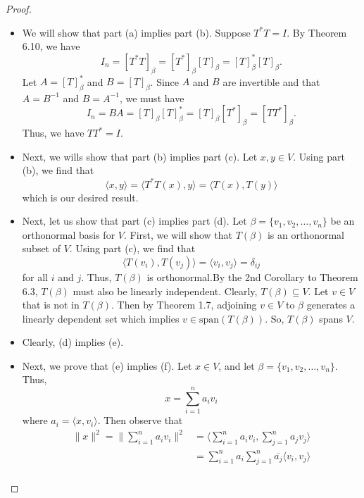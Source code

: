 \begin{proof}
    \begin{itemize}
        \item We will show that part (a) implies part (b). Suppose \( T^{*}T = I  \). By Theorem 6.10, we have  
            \[ {I}_{n} = [T^{*}T]_{\beta} = [T^{*}]_{\beta} [T]_{\beta} = [T]_{\beta}^{*} [T]_{\beta}.  \]
            Let \( A = [T]_{\beta}^{*}  \) and \( B = [T]_{\beta} \). Since \( A  \) and \( B  \) are invertible and that \( A = B^{-1} \) and \( B = A^{-1} \), we must have
            \[ {I}_{n} = BA = [T]_{\beta}[T]_{\beta}^{*} = [T]_{\beta} [T^{*}]_{\beta} = [T T^{*}]_{\beta}.   \]
            Thus, we have \( TT^{*} = I \).
        \item Next, we wills show that part (b) implies part (c). Let \(x,y \in V  \). Using part (b), we find that
            \[  \langle x , y \rangle = \langle T^{*}T(x) , y  \rangle = \langle T(x) , T(y) \rangle \]
            which is our desired result.
        \item Next, let us show that part (c) implies part (d). Let \( \beta = \{ {v}_{1}, {v}_{2}, \dots, {v}_{n} \}  \) be an orthonormal basis for \( V  \). First, we will show that \( T(\beta) \) is an orthonormal subset of \( V  \). Using part (c), we find that 
            \[  \langle T({v}_{i}) , T({v}_{j}) \rangle = \langle {v}_{i} ,  {v}_{j} \rangle = {\delta}_{ij} \]
            for all \( i  \) and \( j  \). Thus, \( T(\beta)  \) is orthonormal.By the 2nd Corollary to Theorem 6.3, \( T(\beta) \) must also be linearly independent. Clearly, \( T(\beta) \subseteq V  \). Let \( v \in V  \) that is not in \( T(\beta) \). Then by Theorem 1.7, adjoining \( v \in V \) to \( \beta \) generates a linearly dependent set which implies \( v \in \text{span}(T(\beta)) \). So, \( T(\beta) \) spans \( V  \).
        \item Clearly, (d) implies (e).
        \item Next, we prove that (e) implies (f). Let \( x \in V  \), and let \( \beta = \{ {v}_{1}, {v}_{2}, \dots, {v}_{n} \}  \). Thus, 
            \[  x = \sum_{ i=1  }^{ n } {a}_{i}{v}_{i} \]
            where \( {a}_{i} = \langle x , {v}_{i} \rangle \). Then observe that 
            \begin{align*}
                \|x\|^{2} = \Big\| \sum_{ i=1  }^{ n } {a}_{i} {v}_{i} \Big\|^{2}
                          &= \Big\langle \sum_{ i=1  }^{ n } {a}_{i} {v}_{i} ,  \sum_{ j=1  }^{ n } {a}_{j} {v}_{j} \Big\rangle \\ 
                          &= \sum_{ i=1  }^{ n } {a}_{i} \sum_{ j=1 }^{ n } \overline{{a}_{j}} \langle {v}_{i}  , {v}_{j} \rangle \\

\end{align*}
\end{itemize}
\end{proof}
